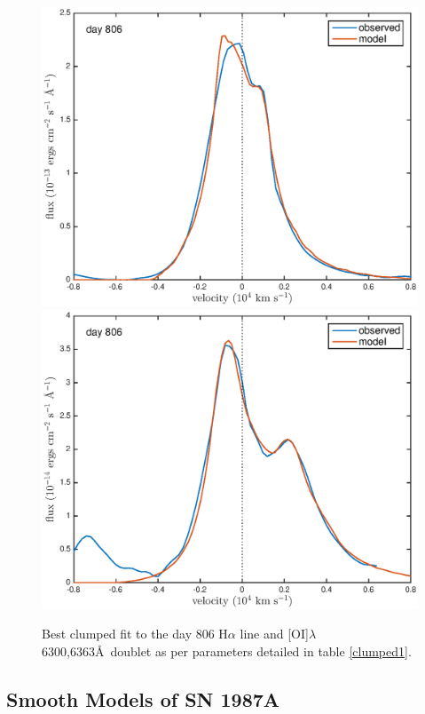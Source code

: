\documentclass[useAMS,usenatbib,usegraphicx]{mnras}
\begin{document}
\begin{figure}
\begin{center}
\includegraphics[trim =37 10 45 15,clip=true,scale=0.51]{clump_1/best_fit/d806Ha}
\includegraphics[trim =35 10 45 15,clip=true,scale=0.51]{clump_1/best_fit/d806OI}
\caption{Best clumped fit to the day 806 H$\alpha$ line and [OI]$\lambda$6300,6363\AA\ doublet as per parameters detailed in table \ref{clumped1}.}
\label{d806_c}
\end{center}
\end{figure}



\subsection{Smooth Models of SN 1987A}
\label{smooth_models}
\end{document}
